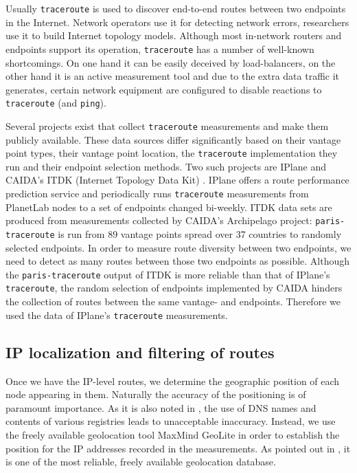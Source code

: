 \documentclass[peerreview]{IEEEtran}
\begin{document}
Usually \texttt{traceroute} is used to discover end-to-end routes between two
endpoints in the Internet. Network operators use it for detecting network
errors, researchers use it to build Internet topology models. Although most
in-network routers and endpoints support its operation, \texttt{traceroute} has
a number of well-known shortcomings. On one hand it can be easily deceived by
load-balancers, on the other hand it is an active measurement tool and due to
the extra data traffic it generates, certain network equipment are configured to
disable reactions to \texttt{traceroute} (and \texttt{ping}).

Several projects exist that collect \texttt{traceroute} measurements and make
them publicly available. These data sources differ significantly based on their
vantage point types, their vantage point location, the \texttt{traceroute}
implementation they run and their endpoint selection methods. Two such projects
are IPlane \cite{iplane} and CAIDA's ITDK (Internet Topology Data Kit)
\cite{caida_itdk}. IPlane offers a route performance prediction service and
periodically runs \texttt{traceroute} measurements from PlanetLab
\cite{Chun_CCR_2003} nodes to a set of endpoints changed bi-weekly. ITDK data
sets are produced from measurements collected by CAIDA's Archipelago project:
\texttt{paris-traceroute} \cite{augustin_avoiding_2006} is run from 89 vantage
points spread over 37 countries to randomly selected endpoints. In order to
measure route diversity between two endpoints, we need to detect as many routes
between those two endpoints as possible. Although the \texttt{paris-traceroute}
output of ITDK is more reliable than that of IPlane's \texttt{traceroute}, the
random selection of endpoints implemented by CAIDA hinders the collection of
routes between the same vantage- and endpoints. Therefore we used the data of
IPlane's \texttt{traceroute} measurements.

\subsection{IP localization and filtering of routes}
\label{sec:filtering}

Once we have the IP-level routes, we determine the geographic position of each
node appearing in them. Naturally the accuracy of the positioning is of
paramount importance. As it is also noted in \cite{laki_spotter:_2011,
  zhang2006dns}, the use of DNS names and contents of various registries leads
to unacceptable inaccuracy. Instead, we use the freely available geolocation
tool MaxMind GeoLite \cite{maxmind} in order to establish the position for the
IP addresses recorded in the measurements. As pointed out in \cite{geocompare},
it is one of the most reliable, freely available geolocation database.
\end{document}
